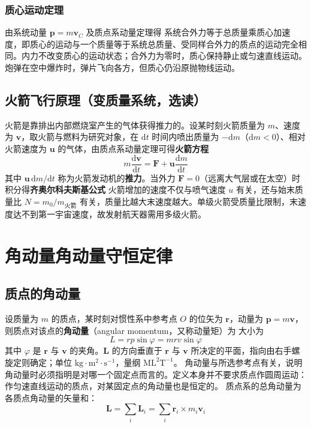         \subsubsection{质心运动定理}
        由系统动量 $\boldsymbol{p}=m\boldsymbol{v}_{C}$ 及质点系动量定理得
        系统合外力等于总质量乘质心加速度，即质心的运动与一个质量等于系统总质量、受同样合外力的质点的运动完全相同。内力不改变质心的运动状态；合外力为零时，质心保持静止或匀速直线运动。炮弹在空中爆炸时，弹片飞向各方，但质心仍沿原抛物线运动。

    \subsection*{火箭飞行原理（变质量系统，选读）}
    火箭是靠排出内部燃烧室产生的气体获得推力的。设某时刻火箭质量为 $m$、速度为 $\boldsymbol{v}$，取火箭与燃料为研究对象，在 $\mathrm{d}t$ 时间内喷出质量为 $-\mathrm{d}m$（$\mathrm{d}m<0$）、相对火箭速度为 $\boldsymbol{u}$ 的气体，由质点系动量定理可得\textbf{火箭方程}
    \[
    m\frac{\mathrm{d}\boldsymbol{v}}{\mathrm{d}t}=\boldsymbol{F}+\boldsymbol{u}\frac{\mathrm{d}m}{\mathrm{d}t}
    \]
    其中 $\boldsymbol{u}\,\mathrm{d}m/\mathrm{d}t$ 称为火箭发动机的\textbf{推力}。当外力 $\boldsymbol{F}=0$（远离大气层或在太空）时积分得\textbf{齐奥尔科夫斯基公式}
    火箭增加的速度不仅与喷气速度 $u$ 有关，还与始末质量比 $N=m_{0}/m_{\text{火箭}}$ 有关，质量比越大末速度越大。单级火箭受质量比限制，末速度达不到第一宇宙速度，故发射航天器需用多级火箭。

\section{角动量\texorpdfstring{\hspace{0.5em}}{ }角动量守恒定律}
    \subsection{质点的角动量}
    设质量为 $m$ 的质点，某时刻对惯性系中参考点 $O$ 的位矢为 $\boldsymbol{r}$，动量为 $\boldsymbol{p}=m\boldsymbol{v}$，则质点对该点的\textbf{角动量}（angular momentum，又称动量矩）为
    大小为
    \[
    L=rp\sin\varphi=mrv\sin\varphi
    \]
    其中 $\varphi$ 是 $\boldsymbol{r}$ 与 $\boldsymbol{v}$ 的夹角。$\boldsymbol{L}$ 的方向垂直于 $\boldsymbol{r}$ 与 $\boldsymbol{v}$ 所决定的平面，指向由右手螺旋定则确定；单位 $\mathrm{kg\cdot m^{2}\cdot s^{-1}}$，量纲 $\mathrm{ML^{2}T^{-1}}$。
    角动量与所选参考点有关，说明角动量时必须指明是对哪一个固定点而言的。定义本身并不要求质点作圆周运动：作匀速直线运动的质点，对某固定点的角动量也是恒定的。
    质点系的总角动量为各质点角动量的矢量和：
    \[
    \boldsymbol{L}=\sum_{i}\boldsymbol{L}_{i}=\sum_{i}\boldsymbol{r}_{i}\times m_{i}\boldsymbol{v}_{i}
    \]

